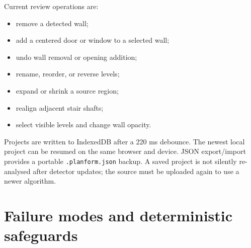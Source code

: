 \documentclass[11pt,a4paper]{article}
\newcommand{\code}[1]{\texttt{#1}}
\begin{document}
Current review operations are:
\begin{itemize}
  \item remove a detected wall;
  \item add a centered door or window to a selected wall;
  \item undo wall removal or opening addition;
  \item rename, reorder, or reverse levels;
  \item expand or shrink a source region;
  \item realign adjacent stair shafts;
  \item select visible levels and change wall opacity.
\end{itemize}

Projects are written to IndexedDB after a 220 ms debounce. The newest local project can be resumed on the same browser and device. JSON export/import provides a portable \code{.planform.json} backup. A saved project is not silently re-analysed after detector updates; the source must be uploaded again to use a newer algorithm.

\section{Failure modes and deterministic safeguards}
\end{document}
